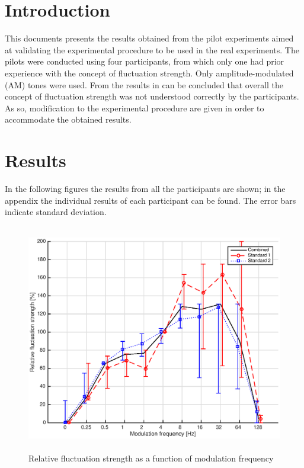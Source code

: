\documentclass[a4paper]{article}
\begin{document}

\section{Introduction} %
\label{sec:introduction}

This documents presents the results obtained from the pilot experiments aimed
at validating the experimental procedure to be used in the real experiments.
The pilots were conducted using four participants, from which only one had prior
experience with the concept of fluctuation strength. Only amplitude-modulated
(AM) tones were used. From the results in can be concluded that overall the
concept of fluctuation strength was not understood correctly by the
participants. As so, modification to the experimental procedure are given in
order to accommodate the obtained results.


\section{Results} %
\label{sec:results}

In the following figures the results from all the participants are shown; in the
appendix the individual results of each participant can be found. The error bars
indicate standard deviation.

\begin{figure}[ht!]
  \centering
  \includegraphics[height=10cm]{img/AM-fm-All-standards.eps}
  \caption{Relative fluctuation strength as a function of modulation frequency}
\label{fig:fm-all}
\end{figure}
\end{document}
